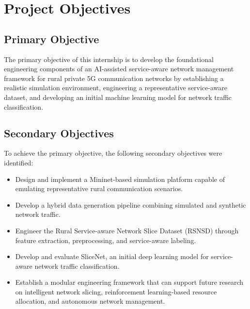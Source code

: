 \documentclass[12pt,a4paper]{report}
\begin{document}
	\section{Project Objectives}
	\label{sec:research_objectives}
	
	\subsection{Primary Objective}
	
	The primary objective of this internship is to develop the foundational engineering components of an AI-assisted service-aware network management framework for rural private 5G communication networks by establishing a realistic simulation environment, engineering a representative service-aware dataset, and developing an initial machine learning model for network traffic classification.
	
	\subsection{Secondary Objectives}
	
	To achieve the primary objective, the following secondary objectives were identified:
	
	\begin{itemize}
		
		\item Design and implement a Mininet-based simulation platform capable of emulating representative rural communication scenarios.
		
		\item Develop a hybrid data generation pipeline combining simulated and synthetic network traffic.
		
		\item Engineer the Rural Service-aware Network Slice Dataset (RSNSD) through feature extraction, preprocessing, and service-aware labeling.
		
		\item Develop and evaluate SliceNet, an initial deep learning model for service-aware network traffic classification.
		
		\item Establish a modular engineering framework that can support future research on intelligent network slicing, reinforcement learning-based resource allocation, and autonomous network management.
		
	\end{itemize}
	
\end{document}
